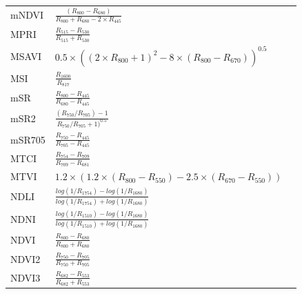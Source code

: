 \documentclass[remotesensing,article,submit,moreauthors,pdftex]{Definitions/mdpi}
\begin{document}
{\begin{supertabular}{lll}
		mNDVI           & $\frac{(R_{800}-R_{680})}{R_{800}+R_{680}-2 \times R_{445}}$                                         & \cite{sims2002a}              \\
		MPRI            & $\frac{R_{515}-R_{530}}{R_{515}+R_{530}}$                                                            & \cite{hernandez-clemente2011} \\
		MSAVI           & \parbox{5.5cm}{$0.5 \times ((2\times R_{800}+1)^2-8\times (R_{800}-R_{670}))^{0.5}$}                 & \cite{qi1994}                 \\
		MSI             & $\frac{R_{1600}}{R_{817}}$                                                                           & \cite{hunt1989}               \\
		mSR             & $\frac{R_{800}-R_{445}}{R_{680}-R_{445}}$                                                            & \cite{sims2002a}              \\
		mSR2            & $\frac{(R_{750}/R_{705})-1}{R_{750}/R_{705}+1)^{0.5}}$                                               & \cite{chen1996}               \\
		mSR705          & $\frac{R_{750}-R_{445}}{R_{705}-R_{445}}$                                                            & \cite{sims2002a}              \\
		MTCI            & $\frac{R_{754}-R_{709}}{R_{709}-R_{681}}$                                                            & \cite{dash2007}               \\
		\midrule
		MTVI            & \parbox{3.8cm}{$1.2 \times (1.2 \times (R_{800}-R_{550})-2.5 \times (R_{670}-R_{550}))$}             & \cite{haboudane2002}          \\
		\midrule
		NDLI            & $\frac{log(1/R_{1754}) - log(1/R_{1680})}{log(1/R_{1754}) + log(1/R_{1680})}$                        & \cite{serrano2002}            \\
		NDNI            & $\frac{log(1/R_{1510}) - log(1/R_{1680})}{log(1/R_{1510}) + log(1/R_{1680})}$                        & \cite{serrano2002}            \\
		NDVI            & $\frac{R_{800}-R_{680}}{R_{800}+R_{680}}$                                                            & \cite{tucker1979}             \\
		NDVI2           & $\frac{R_{750}-R_{705}}{R_{750}+R_{705}}$                                                            & \cite{gitelson1994}           \\
		NDVI3           & $\frac{R_{682}-R_{553}}{R_{682}+R_{553}}$                                                            & \cite{guanter2005}            \\

\end{supertabular}}
\end{document}
